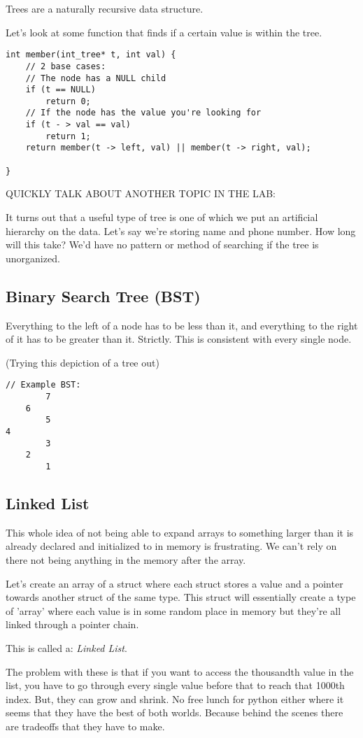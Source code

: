 \documentclass[12pt]{article}
\theoremstyle{definition}
\begin{document}
\note Trees are a naturally recursive data structure. 

Let's look at some function that finds if a certain value is within the tree.
\begin{lstlisting}
int member(int_tree* t, int val) {
    // 2 base cases:
    // The node has a NULL child
    if (t == NULL)
        return 0;
    // If the node has the value you're looking for
    if (t - > val == val)
        return 1;
    return member(t -> left, val) || member(t -> right, val);

}
\end{lstlisting}

QUICKLY TALK ABOUT ANOTHER TOPIC IN THE LAB:

It turns out that a useful type of tree is one of which we put an artificial hierarchy on the data. Let's say we're storing name and phone number. How long will this take? We'd have no pattern or method of searching if the tree is unorganized. 

\subsection{Binary Search Tree (BST)}
Everything to the left of a node has to be less than it, and everything to the right of it has to be greater than it. Strictly. This is consistent with every single node. 

(Trying this depiction of a tree out)
\begin{lstlisting}
// Example BST:
        7
    6 
        5
4
        3
    2
        1
\end{lstlisting}
\subsection{Linked List}
This whole idea of not being able to expand arrays to something larger than it is already declared and initialized to in memory is frustrating. We can't rely on there not being anything in the memory after the array. 

\idea Let's create an array of a struct where each struct stores a value and a pointer towards another struct of the same type. This struct will essentially create a type of 'array' where each value is in some random place in memory but they're all linked through a pointer chain.

This is called a: \emph{Linked List}. 

The problem with these is that if you want to access the thousandth value in the list, you have to go through every single value before that to reach that 1000th index. But, they can grow and shrink. 
\note No free lunch for python either where it seems that they have the best of both worlds. Because behind the scenes there are tradeoffs that they have to make.
\end{document}
